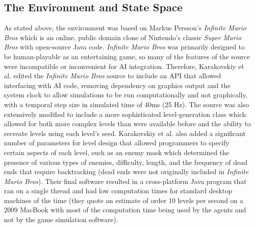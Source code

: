 \documentclass[12pt]{article}
\begin{document}
\begin{multicols*}{2}
\section * {The Environment and State Space}
As stated above, the environment was based on Markus Persson's \textit{Infinite Mario Bros} which is an online,
public domain clone of Nintendo's classic \textit{Super Mario Bros} with open-source Java code. \textit{Infinite Mario Bros}
was primarily designed to be human-playable as an entertaining game, so many of the features of the source were incompatible 
or inconvenient for AI integration. Therefore, Karakovskiy et al. edited the \textit{Infinite Mario Bros} source to include an 
API that allowed interfacing with AI code, removing dependency on graphics output and the system clock to allow simulations 
to be run computationally and not graphically, with a temporal step size in simulated time of 40ms (25 Hz). 
The source was also extensively modified to include a more sophisticated level-generation class which allowed for both 
more complex levels than were available before and the ability to recreate levels using each level's seed. Karakovskiy et al. 
also added a significant number of parameters for level design that allowed programmers to specify certain aspects of each level, 
such as an enemy mask which determined the presence of various types of enemies, difficulty, length, and the frequency of dead 
ends that require backtracking (dead ends were not originally included in \textit{Infinite Mario Bros}). Their final software resulted in a 
cross-platform Java program that ran on a single thread and had low computation times for standard desktop machines of the time 
(they quote an estimate of order 10 levels per second on a 2009 MacBook with most of the computation time being used by the 
agents and not by the game simulation software).


\end{multicols*}
\end{document}
